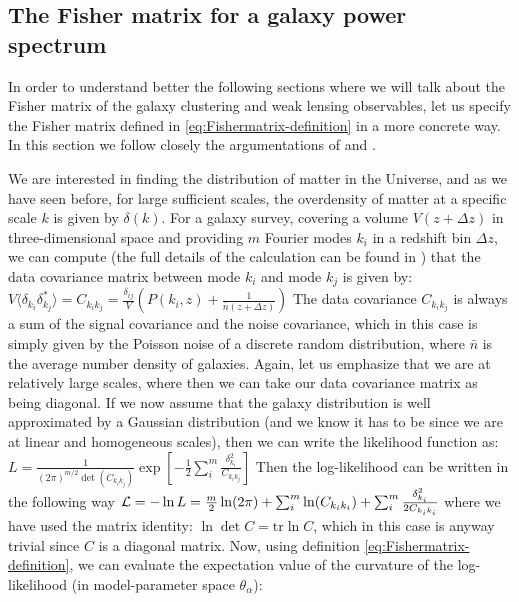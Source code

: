 \subsection{The Fisher matrix for a galaxy power spectrum}

In order to understand better the following sections where we will talk about the 
Fisher matrix of the galaxy clustering and weak lensing observables, let us specify the Fisher
matrix defined in \cref{eq:Fishermatrix-definition} in a more concrete way.
In this section we follow closely the argumentations of \cite{cite Dodelson} and \cite{cite Amendola}.

We are interested in finding the distribution of matter in the Universe, and as we have seen before,
for large sufficient scales, the overdensity of matter at a specific scale $k$ is given by $\delta(k)$.
For a galaxy survey, covering a volume $V(z+ \Delta z)$ in three-dimensional space and providing
$m$ Fourier modes $k_i$ in a redshift bin $\Delta z$, 
we can compute (the full details of the calculation can be found in \cite{cite Dodelson})
that the data covariance matrix between mode $k_i$ and mode $k_j$ is given by:
\beeq$\label{eq:dataCovariancePk}
V \langle\delta_{k_i} \delta^*_{k_j} \rangle = C_{k_{i} k_{j}} = \frac{\delta_{ij}}{V} \left( P(k_i, z) + \frac{1}{\bar{n}(z+\Delta z)} \right)
$
The data covariance $C_{k_{i} k_{j}}$ is always a sum of the signal covariance and the noise covariance, which 
in this case is simply given by the Poisson noise of a discrete random distribution, where $\bar n$ is the 
average number density of galaxies. Again, let us emphasize that we are at relatively large scales, where then
we can take our data covariance matrix as being diagonal.
If we now assume that the galaxy distribution is well approximated by a Gaussian distribution (and we 
know it has to be since we are at linear and homogeneous scales), then we can
write the likelihood function as:
\beeq$\label{eq:likelihood-Pofk}
L=\frac{1}{(2\pi)^{m/2} \det (C_{k_{i} k_{j}}) } \exp \left[-\frac{1}{2}\sum_{i}^{m} 
\frac{\delta^2_{k_i}}{C_{k_{i} k_{j}}} \right] $
Then the log-likelihood can be written in the following way
\beeq$\label{eq:loglik-Pk}
\mathcal{L} = -\ln L = \frac{m}{2} \ln(2\pi) + \sum_{i}^{m}\ln(C_{k_{i} k_{i}}) + \sum_{i}^{m}\frac{\delta^2_{k_i}}{2 C_{k_{i} k_{i}}}
$
where we have used the matrix identity: $\ln \det C = \mathrm{tr} \ln C$, which in this case is anyway trivial since $C$ is a diagonal matrix.
Now, using definition \ref{eq:Fishermatrix-definition}, we can evaluate the expectation value of the 
curvature of the log-likelihood (in model-parameter space $\theta_{\alpha}$):
